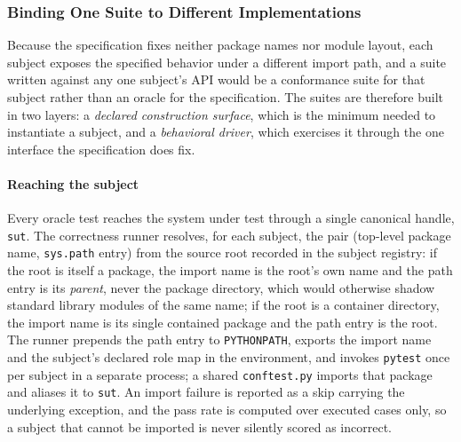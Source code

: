 %

\subsubsection{Binding One Suite to Different Implementations}
\label{sec:oracle-binding}

Because the specification fixes neither package names nor module
layout, each subject exposes the specified behavior under a different
import path, and a suite written against any one subject's API would be
a conformance suite for that subject rather than an oracle for the
specification. The suites are therefore built in two layers: a
\emph{declared construction surface}, which is the minimum needed to
instantiate a subject, and a \emph{behavioral driver}, which exercises
it through the one interface the specification does fix.

\paragraph{Reaching the subject}
Every oracle test reaches the system under test through a single
canonical handle, \texttt{sut}. The correctness runner resolves, for
each subject, the pair (top-level package name, \texttt{sys.path} entry)
from the source root recorded in the subject registry: if the root is
itself a package, the import name is the root's own name and the path
entry is its \emph{parent}, never the package directory, which would
otherwise shadow standard library modules of the same name; if the root
is a container directory, the import name is its single contained
package and the path entry is the root. The runner prepends the path
entry to \texttt{PYTHONPATH}, exports the import name and the subject's
declared role map in the environment, and invokes \texttt{pytest} once
per subject in a separate process; a shared \texttt{conftest.py} imports
that package and aliases it to \texttt{sut}. An import failure is
reported as a skip carrying the underlying exception, and the pass rate
is computed over executed cases only, so a subject that cannot be
imported is never silently scored as incorrect.

